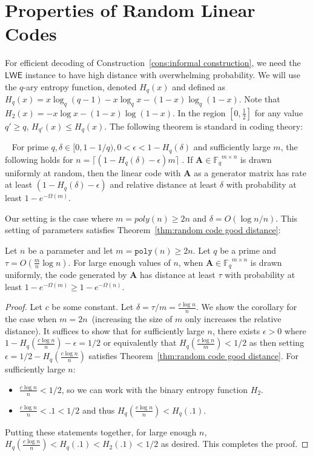 \documentclass{llncs}
\newcommand{\thref}[1]{\mbox{Theorem~\ref{#1}}}
\newcommand{\consref}[1]{\mbox{Construction~\ref{#1}}}
\newcommand{\class}[1]{{\ensuremath{\mathsf{#1}}}}
\newcommand{\vect}[1]{\ensuremath{\mathbf{#1}}}
\newcommand{\Fq}{\ensuremath{\mathbb{F}_q}}
\newcommand{\poly}{\ensuremath{\mathtt{poly}}\xspace}
\newcommand{\LWE}{\class{LWE}}
\newcommand{\vA}{\vect{A}}
\begin{document}
\section{Properties of Random Linear Codes}
For efficient decoding of \consref{cons:informal construction}, we need the $\LWE$ instance to have high distance with overwhelming probability.  We will use the $q$-ary entropy function, denoted $H_q(x)$ and defined as $H_q(x) = x\log _q(q-1) - x\log_q x - (1-x)\log_q (1-x)$.  Note that $H_2(x) = -x\log x - (1-x)\log (1-x)$.  In the region $[0, \frac{1}{2}]$ for any value $q'\geq q$, $H_{q'}(x)\leq H_{q}(x)$.  The following theorem is standard in coding theory:

\begin{theorem}~\cite[Theorem 8]{venkatLecture}
\label{thm:random code good distance}
For prime $q, \delta\in [0, 1-1/q), 0<\epsilon< 1-H_q(\delta)$ and sufficiently large $m$, the following holds for $n = \lceil (1-H_q(\delta) - \epsilon)m\rceil$ .  If $\vA \in \Fq^{m\times n}$ is drawn uniformly at random, then the linear code with $\vA$ as a generator matrix has rate at least $(1-H_q(\delta) -\epsilon)$ and relative distance at least $\delta$ with probability at least $1-e^{-\Omega(m)}$.
\end{theorem}
Our setting is the case where $m = poly(n)\geq 2n$ and $\delta = O (\log n /n)$.  This setting of parameters satisfies \thref{thm:random code good distance}:
\begin{corollary}
\label{cor:code high distance}
Let $n$ be a parameter and let $m = \poly(n)\geq 2n$.  
Let $q$ be a prime and $\tau = O(\frac{m}{n}\log n )$.  For large enough values of $n$, when $\vA\in \Fq^{m\times n}$ is drawn uniformly, the code generated by $\vA$ has distance at least $\tau$ with probability at least $1-e^{-\Omega(m)}\geq 1-e^{-\Omega(n)}$.
\end{corollary}
\begin{proof}
Let $c$ be some constant.  Let $\delta = \tau/m = \frac{c\log n}{n}$.  We show the corollary for the case when $m = 2n$~(increasing the size of $m$ only increases the relative distance).  It suffices to show that for sufficiently large $n$, there exists $\epsilon>0$ where $1- H_q(\frac{c\log n}{n}) - \epsilon = 1/2$ or equivalently that $H_q(\frac{c\log n}{m})< 1/2$ as then setting $\epsilon = 1/2-H_q(\frac{c\log n}{n})$ satisfies  \thref{thm:random code good distance}.  For sufficiently large $n$:
\begin{itemize}
\item $\frac{c\log n}{n}< 1/2$, so we can work with the binary entropy function $H_2$.  
\item $\frac{c\log n}{n}< .1 < 1/2$ and thus $H_q(\frac{c\log n}{n})< H_q(.1)$. 
\end{itemize}  Putting these statements together, for large enough $n$, $H_q(\frac{c\log n}{n})< H_q(.1) < H_2(.1)< 1/2$ as desired.  This completes the proof.
\end{proof}
\end{document}
